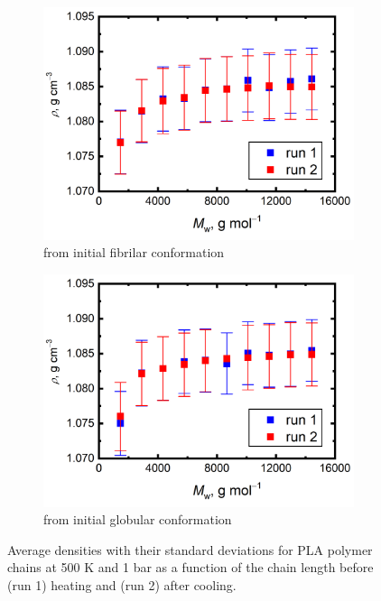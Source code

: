 \begin{figure}[htb!]
	\begin{subfigure}{0.5\textwidth}
		\includegraphics[width=1.0\linewidth]{img/pla_linear_density.png} 
		\caption{from initial fibrilar conformation}
		\vspace{-0.2cm}
	\end{subfigure}
	\begin{subfigure}{0.5\textwidth}
		\includegraphics[width=1.0\linewidth]{img/pla_glob_density.png}
		\caption{from initial globular conformation}
		\vspace{-0.2cm}
	\end{subfigure} 
	\caption{Average densities with their standard deviations for PLA polymer chains at 500 K and 1 bar as a function of the chain length before (run 1) heating and (run 2) after cooling.}
	\label{fig:pla_hustoty}
	\vspace{-0.2cm}
\end{figure}

